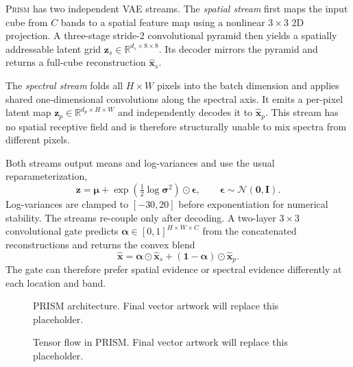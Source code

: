 \documentclass{article}
\newcommand{\prism}{\textsc{Prism}}
\begin{document}
\prism{} has two independent VAE streams. The \emph{spatial stream} first maps the input cube from $C$ bands to a spatial feature map using a nonlinear $3\times3$ 2D projection. A three-stage stride-2 convolutional pyramid then yields a spatially addressable latent grid $\mathbf{z}_s\in\mathbb{R}^{d_s\times8\times8}$. Its decoder mirrors the pyramid and returns a full-cube reconstruction $\hat{\mathbf{x}}_s$.

The \emph{spectral stream} folds all $H\times W$ pixels into the batch dimension and applies shared one-dimensional convolutions along the spectral axis. It emits a per-pixel latent map $\mathbf{z}_p\in\mathbb{R}^{d_p\times H\times W}$ and independently decodes it to $\hat{\mathbf{x}}_p$. This stream has no spatial receptive field and is therefore structurally unable to mix spectra from different pixels.

Both streams output means and log-variances and use the usual reparameterization,
\begin{equation}
\mathbf{z}=\boldsymbol{\mu}+\exp\left(\tfrac{1}{2}\log\boldsymbol{\sigma}^{2}\right)\odot\boldsymbol{\epsilon},
\qquad \boldsymbol{\epsilon}\sim\mathcal{N}(\mathbf{0},\mathbf{I}).
\end{equation}
Log-variances are clamped to $[-30,20]$ before exponentiation for numerical stability. The streams re-couple only after decoding. A two-layer $3\times3$ convolutional gate predicts $\boldsymbol{\alpha}\in[0,1]^{H\times W\times C}$ from the concatenated reconstructions and returns the convex blend
\begin{equation}
\hat{\mathbf{x}}=\boldsymbol{\alpha}\odot\hat{\mathbf{x}}_s+
(\mathbf{1}-\boldsymbol{\alpha})\odot\hat{\mathbf{x}}_p.
\label{eq:fusion}
\end{equation}
The gate can therefore prefer spatial evidence or spectral evidence differently at each location and band.

\begin{figure}[t]
\centering
{}
\caption{PRISM architecture. Final vector artwork will replace this placeholder.}
\label{fig:architecture}
\end{figure}

\begin{figure}[t]
\centering
{}
\caption{Tensor flow in PRISM. Final vector artwork will replace this placeholder.}
\label{fig:tensorflow}
\end{figure}
\end{document}
